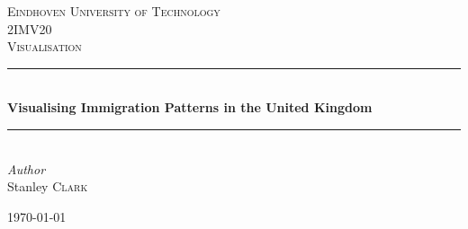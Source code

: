 \documentclass[11pt,a4paper,titlepage]{article}
\begin{document}
\begin{titlepage} %
	\newcommand{\HRule}{\rule{\linewidth}{0.5mm}} %
	
	
	\textsc{\LARGE Eindhoven University of Technology}\\[1.5cm] %
	
	\textsc{\Large 2IMV20}\\[0.5cm] %
	
	\textsc{\large Visualisation}\\[0.5cm] %
	
	
	\HRule\\[0.4cm]
	
	{\huge\bfseries Visualising Immigration Patterns in the United Kingdom}\\[0.4cm] %
	
	\HRule\\[1.5cm]
	
	
	{\large\textit{Author}}\\
	Stanley \textsc{Clark} %
	
	
	\vfill\vfill\vfill %
	
	{\large\today} %
	
	
	\vfill %
	
\end{titlepage}

\tableofcontents
\clearpage
\end{document}
